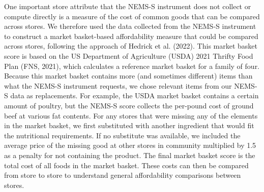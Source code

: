 \documentclass[
  letterpaper,
  DIV=11,
  numbers=noendperiod]{scrreport}
\begin{document}
One important store attribute that the NEMS-S instrument does not
collect or compute directly is a measure of the cost of common goods
that can be compared across stores. We therefore used the data collected
from the NEMS-S instrument to construct a market basket-based
affordability measure that could be compared across stores, following
the approach of Hedrick et al. (2022). This market basket score is based
on the US Department of Agriculture (USDA) 2021 Thrifty Food Plan (FNS,
2021), which calculates a reference market basket for a family of four.
Because this market basket contains more (and sometimes different) items
than what the NEMS-S instrument requests, we chose relevant items from
our NEMS-S data as replacements. For example, the USDA market basket
contains a certain amount of poultry, but the NEMS-S score collects the
per-pound cost of ground beef at various fat contents. For any stores
that were missing any of the elements in the market basket, we first
substituted with another ingredient that would fit the nutritional
requirements. If no substitute was available, we included the average
price of the missing good at other stores in community multiplied by 1.5
as a penalty for not containing the product. The final market basket
score is the total cost of all foods in the market basket. These costs
can then be compared from store to store to understand general
affordability comparisons between stores.
\end{document}

